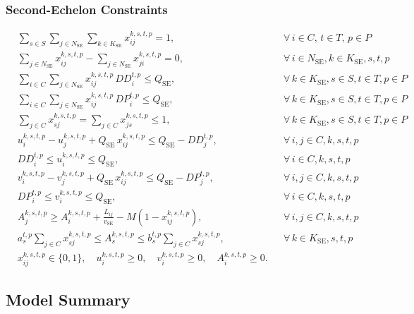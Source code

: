 \documentclass[11pt, a4paper]{article}
\newcommand{\KSE}{K_{\mathrm{SE}}}
\newcommand{\NSE}{N_{\mathrm{SE}}}
\newcommand{\QSE}{Q_{\mathrm{SE}}}
\newcommand{\vSE}{v_{\mathrm{SE}}}
\numberwithin{equation}{section}
\begin{document}
\subsubsection{Second-Echelon Constraints}

\begin{align}
  &\sum_{s\in S}\sum_{j\in\NSE}\sum_{k\in\KSE}x_{ij}^{k,s,t,p}=1,
  &&\forall\,i\in C,\,t\in T,\,p\in P
  \tag{C9}\label{c9}\\
  &\sum_{j\in\NSE}x_{ij}^{k,s,t,p}-\sum_{j\in\NSE}x_{ji}^{k,s,t,p}=0,
  &&\forall\,i\in\NSE,k\in\KSE,s,t,p
  \tag{C10}\label{c10}\\
  &\sum_{i\in C}\sum_{j\in\NSE}x_{ij}^{k,s,t,p}\,DD_i^{t,p}\le\QSE,
  &&\forall\,k\in\KSE,s\in S,t\in T,p\in P
  \tag{C11a}\label{c11a}\\
  &\sum_{i\in C}\sum_{j\in\NSE}x_{ij}^{k,s,t,p}\,DP_i^{t,p}\le\QSE,
  &&\forall\,k\in\KSE,s\in S,t\in T,p\in P
  \tag{C11b}\label{c11b}\\
  &\sum_{j\in C}x_{sj}^{k,s,t,p}=\sum_{j\in C}x_{js}^{k,s,t,p}\le 1,
  &&\forall\,k\in\KSE,s\in S,t\in T,p\in P
  \tag{C12}\label{c12}\\
  &u_i^{k,s,t,p}-u_j^{k,s,t,p}+\QSE\,x_{ij}^{k,s,t,p}\le\QSE-DD_j^{t,p},
  &&\forall\,i,j\in C,k,s,t,p
  \tag{C13a}\label{c13a}\\
  &DD_i^{t,p}\le u_i^{k,s,t,p}\le\QSE,
  &&\forall\,i\in C,k,s,t,p
  \tag{C13b}\label{c13b}\\
  &v_i^{k,s,t,p}-v_j^{k,s,t,p}+\QSE\,x_{ij}^{k,s,t,p}\le\QSE-DP_j^{t,p},
  &&\forall\,i,j\in C,k,s,t,p
  \tag{C13c}\label{c13c}\\
  &DP_i^{t,p}\le v_i^{k,s,t,p}\le\QSE,
  &&\forall\,i\in C,k,s,t,p
  \tag{C13d}\label{c13d}\\
  &A_j^{k,s,t,p}\ge A_i^{k,s,t,p}+\frac{L_{ij}}{\vSE}
    -M(1-x_{ij}^{k,s,t,p}),
  &&\forall\,i,j\in C,k,s,t,p
  \tag{C14}\label{c14}\\
  &a_s^{t,p}\sum_{j\in C}x_{sj}^{k,s,t,p}\le A_s^{k,s,t,p}
    \le b_s^{t,p}\sum_{j\in C}x_{sj}^{k,s,t,p},
  &&\forall\,k\in\KSE,s,t,p
  \tag{C15}\label{c15}\\
  &x_{ij}^{k,s,t,p}\in\{0,1\},\quad
  u_i^{k,s,t,p}\ge 0,\quad
  v_i^{k,s,t,p}\ge 0,\quad
  A_i^{k,s,t,p}\ge 0.
  \tag{C16}\label{c16}
\end{align}

\subsection{Model Summary}
\end{document}
